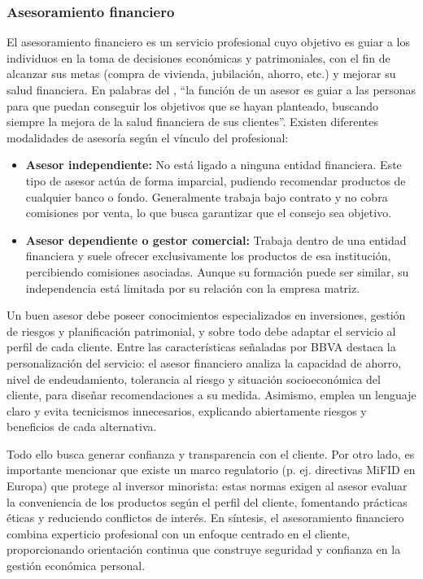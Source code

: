 {}
\subsubsection*{Asesoramiento financiero}

El asesoramiento financiero es un servicio profesional cuyo objetivo es guiar a los individuos en la toma de decisiones económicas y patrimoniales, con el fin de alcanzar sus metas (compra de vivienda, jubilación, ahorro, etc.) y mejorar su salud financiera. En palabras del \textcite{BBVA02}, ``la función de un asesor es guiar a las personas para que puedan conseguir los objetivos que se hayan planteado, buscando siempre la mejora de la salud financiera de sus clientes''. Existen diferentes modalidades de asesoría según el vínculo del profesional:

\begin{itemize}
	\item \textbf{Asesor independiente:} No está ligado a ninguna entidad financiera. Este tipo de asesor actúa de forma imparcial, pudiendo recomendar productos de cualquier banco o fondo. Generalmente trabaja bajo contrato y no cobra comisiones por venta, lo que busca garantizar que el consejo sea objetivo.
	\item \textbf{Asesor dependiente o gestor comercial:} Trabaja dentro de una entidad financiera y suele ofrecer exclusivamente los productos de esa institución, percibiendo comisiones asociadas. Aunque su formación puede ser similar, su independencia está limitada por su relación con la empresa matriz.
\end{itemize}

Un buen asesor debe poseer conocimientos especializados en inversiones, gestión de riesgos y planificación patrimonial, y sobre todo debe adaptar el servicio al perfil de cada cliente. Entre las características señaladas por BBVA destaca la personalización del servicio: el asesor financiero analiza la capacidad de ahorro, nivel de endeudamiento, tolerancia al riesgo y situación socioeconómica del cliente, para diseñar recomendaciones a su medida. Asimismo, emplea un lenguaje claro y evita tecnicismos innecesarios, explicando abiertamente riesgos y beneficios de cada alternativa.

Todo ello busca generar confianza y transparencia con el cliente. Por otro lado, es importante mencionar que existe un marco regulatorio (p. ej. directivas MiFID en Europa) que protege al inversor minorista: estas normas exigen al asesor evaluar la conveniencia de los productos según el perfil del cliente, fomentando prácticas éticas y reduciendo conflictos de interés. En síntesis, el asesoramiento financiero combina experticio profesional con un enfoque centrado en el cliente, proporcionando orientación continua que construye seguridad y confianza en la gestión económica personal.

